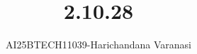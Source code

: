 \documentclass[journal]{IEEEtran}
\begin{document}

\vspace{3cm}

\title{2.10.28}
\author{AI25BTECH11039-Harichandana Varanasi}
 \maketitle
{\let\newpage\relax\maketitle}

\renewcommand{\thefigure}{\theenumi}
\renewcommand{\thetable}{\theenumi}
\setlength{\intextsep}{10pt} %


\renewcommand{\thetable}{\theenumi}



\date{}
\end{document}
